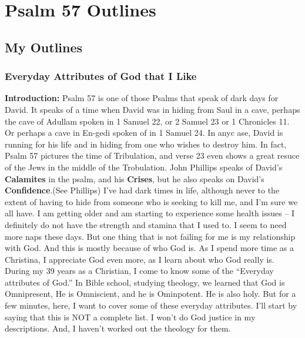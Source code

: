 \section{Psalm 57 Outlines}

\subsection{My Outlines}

\subsubsection{Everyday Attributes of God that I Like}
\textbf{Introduction:} Psalm 57 is one of those Psalms that speak of dark days for David. It speaks of a time when David was in hiding from Saul in a cave, perhaps the cave of Adullam spoken in 1 Samuel 22, or 2 Samuel 23 or 1 Chronicles 11.  Or perhaps a cave in En-gedi spoken of in 1 Samuel 24. In anyc ase, David is running for his life and in hiding from one who wishes to destroy him.  In fact, Psalm 57 pictures the time of Tribulation, and verse 23 even shows a great resuce of the Jews in the middle of the Trobulation. John Phillips speaks of David's \textbf{Calamites} in the psalm, and his \textbf{Crises}, but he also speaks on David's \textbf{Confidence}.(See Phillips) I've had dark times in life, although never to the extent of having to hide from someone who is seeking to kill me, and I'm sure we all have. I am getting older and am starting to experience some health issues -- I definitely do not have the strength and stamina that I used to. I seem to need more naps these days. But one thing that is not failing for me is my relationship with God. And this is mostly because of who God is.  As I spend more time as a Christina, I appreciate God even more, as I learn about who God really is. During my 39 years as a Christian, I come to know some of the ``Everyday attributes of God.'' In Bible school, studying theology, we learned that God is Omnipresent, He is Omniscient, and he is Ominpotent.  He is also holy. But for a few minutes, here, I want to cover some of these everyday attributes. I'll start by saying that this is NOT a complete list. I won't do God justice in my descriptions. And, I haven't worked out the theology for them.
